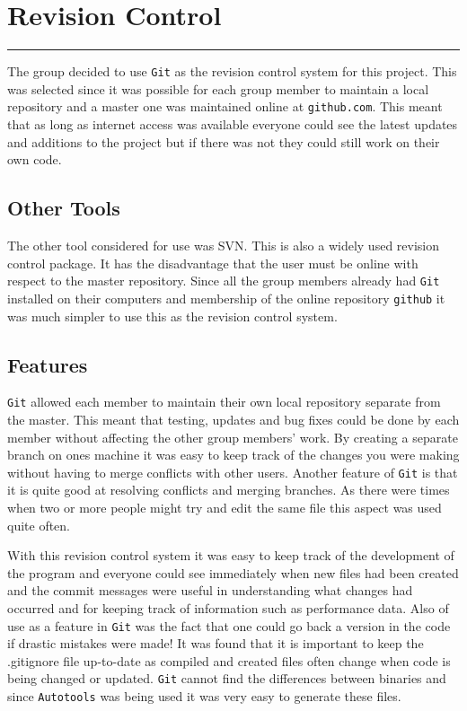\section{Revision Control}
\vspace{-2em}\rule{\textwidth}{1pt}\vspace{1em}

The group decided to use \texttt{Git} as the revision control system for this project.
This was selected since it was possible for each group member to maintain a local repository and a master one was maintained online at \texttt{github.com}.
This meant that as long as internet access was available everyone could see the latest updates and additions to the project but if there was not they could still work on their own code.

\subsection{Other Tools}
The other tool considered for use was SVN.
This is also a widely used revision control package.
It has the disadvantage that the user must be online with respect to the master repository.
Since all the group members already had \texttt{Git} installed on their computers and membership of the online repository \texttt{github} it was much simpler to use this as the revision control system.

\subsection{Features}
\texttt{Git} allowed each member to maintain their own local repository separate from the master.
This meant that testing, updates and bug fixes could be done by each member without affecting the other group members' work.
By creating a separate branch on ones machine it was easy to keep track of the changes you were making without having to merge conflicts with other users.
Another feature of \texttt{Git} is that it is quite good at resolving conflicts and merging branches.
As there were times when two or more people might try and edit the same file this aspect was used quite often.

With this revision control system it was easy to keep track of the development of the program and everyone could see immediately when new files had been created and the commit messages were useful in understanding what changes had occurred and for keeping track of information such as performance data.
Also of use as a feature in \texttt{Git} was the fact that one could go back a version in the code if drastic mistakes were made!
It was found that it is important to keep the .gitignore file up-to-date as compiled and created files often change when code is being changed or updated.
\texttt{Git} cannot find the differences between binaries and since \texttt{Autotools} was being used it was very easy to generate these files.

